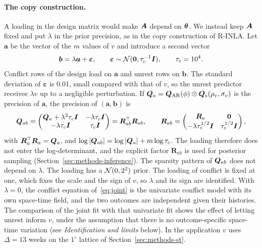 \paragraph{The copy construction.} A loading in the design matrix would make $\bm{A}$
depend on $\bm{\theta}$. We instead keep $\bm{A}$ fixed and put $\lambda$ in the prior
precision, as in the copy construction of R-INLA. Let $\bm{a}$ be the vector of the
$m$ values of $v$ and introduce a second vector
\[
\bm{b} = \lambda\bm{a} + \bm{\varepsilon}, \qquad \bm{\varepsilon} \sim \mathcal{N}(\bm{0}, \tau_c^{-1}\bm{I}),
\qquad \tau_c = 10^4 .
\]
Conflict rows of the design load on $\bm{a}$ and unrest rows on $\bm{b}$. The standard
deviation of $\bm{\varepsilon}$ is $0.01$, small compared with that of $v$, so the
unrest predictor receives $\lambda v$ up to a negligible perturbation. If
$\bm{Q}_a = \bm{Q}_{\mathrm{AR}}(\phi) \otimes \bm{Q}_s(\rho_v, \sigma_v)$ is the precision of
$\bm{a}$, the precision of $(\bm{a}, \bm{b})$ is
\[
\bm{Q}_{ab} =
\begin{pmatrix}
\bm{Q}_a + \lambda^2\tau_c\bm{I} & -\lambda\tau_c\bm{I}\\
-\lambda\tau_c\bm{I} & \tau_c\bm{I}
\end{pmatrix}
= \bm{R}_{ab}^\top\bm{R}_{ab},
\qquad
\bm{R}_{ab} =
\begin{pmatrix}
\bm{R}_a & \bm{0}\\
-\lambda\tau_c^{1/2}\bm{I} & \tau_c^{1/2}\bm{I}
\end{pmatrix},
\]
with $\bm{R}_a^\top\bm{R}_a = \bm{Q}_a$, and
$\log|\bm{Q}_{ab}| = \log|\bm{Q}_a| + m\log\tau_c$. The loading therefore does not enter the
log-determinant, and the explicit factor $\bm{R}_{ab}$ is used for posterior sampling
(Section~\ref{sec:methods-inference}). The sparsity pattern of $\bm{Q}_{ab}$ does not
depend on $\lambda$. The loading has a $\mathcal{N}(0, 2^2)$ prior. The loading of conflict
is fixed at one, which fixes the scale and the sign of $v$, so $\lambda$ and its sign
are identified. With $\lambda = 0$, the conflict equation of~\eqref{eq:joint} is the
univariate conflict model with its own space-time field, and the two outcomes are
independent given their histories. The comparison of the joint fit with that
univariate fit shows the effect of letting unrest inform $v$, under the assumption that
there is no outcome-specific space-time variation (see \emph{Identification and
limits} below). In the
application $v$ uses $\Delta = 13$ weeks on the $1^\circ$ lattice of
Section~\ref{sec:methods-st}.

